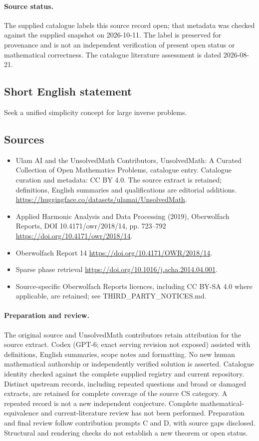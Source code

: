 \documentclass[11pt]{article}
\begin{document}
\paragraph{Source status.}
The supplied catalogue labels this source record open; that metadata was checked against the supplied snapshot on 2026-10-11. The label is preserved for provenance and is not an independent verification of present open status or mathematical correctness. The catalogue literature assessment is dated 2026-08-21.
\subsection{Short English statement}
Seek a unified simplicity concept for large inverse problems.
\subsection{Sources}
\begin{itemize}
\item[S1] Ulam AI and the UnsolvedMath Contributors, UnsolvedMath: A Curated Collection of Open Mathematics Problems, catalogue entry. Catalogue curation and metadata: CC BY 4.0. The source extract is retained; definitions, English summaries and qualifications are editorial additions.
\url{https://huggingface.co/datasets/ulamai/UnsolvedMath}.
\item[S2] Applied Harmonic Analysis and Data Processing (2019), Oberwolfach Reports, DOI 10.4171/owr/2018/14, pp. 723--792
\url{https://doi.org/10.4171/owr/2018/14}.
\item[S3] Oberwolfach Report 14
\url{https://doi.org/10.4171/OWR/2018/14}.
\item[S4] Sparse phase retrieval
\url{https://doi.org/10.1016/j.acha.2014.04.001}.
\item Source-specific Oberwolfach Reports licences, including CC BY-SA 4.0 where applicable, are retained; see THIRD\_PARTY\_NOTICES.md.
\end{itemize}
\paragraph{Preparation and review.}
The original source and UnsolvedMath contributors retain attribution for the source extract. Codex (GPT-6; exact serving revision not exposed) assisted with definitions, English summaries, scope notes and formatting. No new human mathematical authorship or independently verified solution is asserted. Catalogue identity checked against the complete supplied registry and current repository. Distinct upstream records, including repeated questions and broad or damaged extracts, are retained for complete coverage of the source CS category. A repeated record is not a new independent conjecture. Complete mathematical-equivalence and current-literature review has not been performed. Preparation and final review follow contribution prompts C and D, with source gaps disclosed. Structural and rendering checks do not establish a new theorem or open status.
\label{end:statement}
\end{document}
